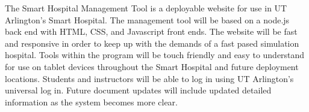 The Smart Hospital Management Tool is a deployable website for use in UT Arlington's Smart Hospital. The management tool will be based on a node.js back end with HTML, CSS, and Javascript front ends. The website will be fast and responsive in order to keep up with the demands of a fast pased simulation hospital. Tools within the program will be touch friendly and easy to understand for use on tablet devices throughout the Smart Hospital and future deployment locations. Students and instructors will be able to log in using UT Arlington's universal log in. Future document updates will include updated detailed information as the system becomes more clear.